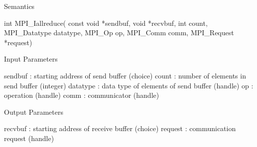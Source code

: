 Semantics

int MPI_Iallreduce(
    const void *sendbuf, void *recvbuf,
    int count, MPI_Datatype datatype, MPI_Op op, MPI_Comm comm,
    MPI_Request *request)

Input Parameters

sendbuf : starting address of send buffer (choice)
count : number of elements in send buffer (integer)
datatype : data type of elements of send buffer (handle)
op : operation (handle)
comm : communicator (handle)

Output Parameters

recvbuf : starting address of receive buffer (choice)
request : communication request (handle)
